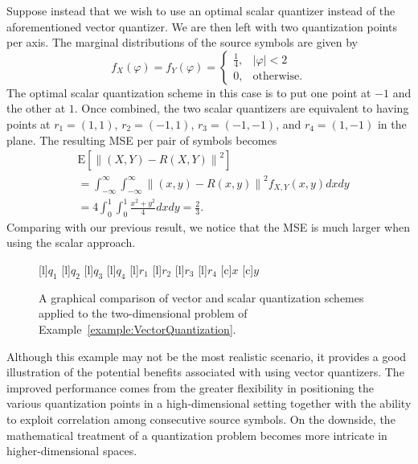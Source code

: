 \begin{example}
Suppose instead that we wish to use an optimal scalar quantizer instead of the aforementioned vector quantizer.
We are then left with two quantization points per axis.
The marginal distributions of the source symbols are given by
\begin{equation*}
f_X (\varphi) = f_Y (\varphi)
= \begin{cases} \frac{1}{4}, & |\varphi| < 2 \\
0, & \text{otherwise} . \end{cases}
\end{equation*}
The optimal scalar quantization scheme in this case is to put one point at $-1$ and the other at $1$.
Once combined, the two scalar quantizers are equivalent to having points at $r_1 = (1,1)$, $r_2 = (-1,1)$, $r_3 = (-1,-1)$, and $r_4 = (1,-1)$ in the plane.
The resulting MSE per pair of symbols becomes
\begin{equation*}
\begin{split}
&\mathrm{E} \left[ \left\| (X,Y) - R(X,Y) \right\|^2 \right] \\
&= \int_{-\infty}^{\infty} \int_{-\infty}^{\infty}
\left\| (x, y) - R(x, y) \right\|^2 f_{X,Y}(x,y) dx dy \\
&= 4 \int_0^1 \int_0^1 \frac{x^2 + y^2}{4} dx dy
= \frac{2}{3} .
\end{split}
\end{equation*}
Comparing with our previous result, we notice that the MSE is much larger when using the scalar approach.
\begin{figure}[htbp]
\begin{center}
\begin{psfrags}
[l]{$q_1$}
[l]{$q_2$}
[l]{$q_3$}
[l]{$q_4$}
[l]{$r_1$}
[l]{$r_2$}
[l]{$r_3$}
[l]{$r_4$}
[c]{$x$}
[c]{$y$}
\end{psfrags}
\caption{A graphical comparison of vector and scalar quantization schemes applied to the two-dimensional problem of Example~\ref{example:VectorQuantization}.}
\label{figure:VectorQuantizer}
\end{center}
\end{figure}
\end{example}

Although this example may not be the most realistic scenario, it provides a good illustration of the potential benefits associated with using vector quantizers.
The improved performance comes from the greater flexibility in positioning the various quantization points in a high-dimensional setting together with the ability to exploit correlation among consecutive source symbols.
On the downside, the mathematical treatment of a quantization problem becomes more intricate in higher-dimensional spaces.


